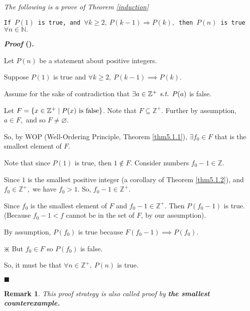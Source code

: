 \documentclass[12pt,a4paper]{article}
\newcounter{nprf}[subsection]
\newtheorem*{rmk}{\indent Remark}
\newenvironment*{prf}{\par\indent\textbf{\textit{Proof} (\stepcounter{nprf}\thenprf). }\par }{\par\hfill $\blacksquare$\par}
\def\Z{{\mathbb{Z}}}
\def\N{{\mathbb{N}}}
\def\Zp{{\Z^{+}}}
\def\emptyset{\varnothing}
\def\st{\emph{ s.t. }}
\begin{document}
\begin{framed}
\noindent\textit{The following is a prove of Theorem \ref{induction}}\par\noindent
\texttt{If $P(1)$ is true, and $\forall k\geq2,\ P(k-1)\Rightarrow P(k),$ then $P(n)$ is true $\forall n\in\N.$}
\begin{prf}
	Let $P(n)$ be a statement about positive integers. \par Suppose $P(1)$ is true and $\forall k\geq2,\ P(k-1)\implies P(k).$\par Assume for the sake of contradiction that $\exists a\in\Zp\st P(a)$ is false. \par Let $F=\qty{x\in\Zp\mid P(x)\text{ is false}}$. Note that $F\subseteq\Zp.$ Further by assumption, $a\in F,$ and so $F\neq\emptyset.$\par So, by WOP (Well-Ordering Principle, Theorem \ref{thm5.1.1}), $\exists f_0\in F$ that is the smallest element of $F$. $\qquad$\big[WTS: $F=\emptyset$\big]\par Note that since $P(1)$ is true, then $1\notin F.$ Consider numbers $f_0-1\in\Z.$\par Since $1$ is the smallest positive integer (a corollary of Theorem \ref{thm5.1.2}), and $f_0\in\Zp,$ we have $f_0>1$. So, $f_0-1\in\Zp.$\par Since $f_0$ is the smallest element of $F$ and $f_0-1\in\Zp.$ Then $P(f_0-1)$ is true. (Because $f_0-1<f$ cannot be in the set of $F$, by our assumption).\par By assumption, $P(f_0)$ is true because $F(f_0-1)\implies P(f_0).$\par\begin{center}$\divideontimes$ But $f_0\in F$ so $P(f_0)$ is false. \end{center}\par So, it must be that $\forall n\in\Zp,\ P(n)$ is true. 
\end{prf}
\begin{rmk} This proof strategy is also called proof by \textbf{the smallest counterexample. }\end{rmk}
\end{framed}
\end{document}
